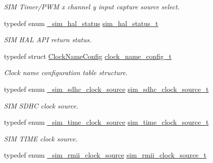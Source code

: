 \begin{DoxyCompactItemize}
\begin{DoxyCompactList}\small\item\em S\+IM Timer/\+P\+WM x channel y input capture source select. \end{DoxyCompactList}\item 
typedef enum \hyperlink{group__sim__hal_ga3a1d5c9d6e79932e64f798c04fae38fd}{\+\_\+sim\+\_\+hal\+\_\+status} \hyperlink{group__sim__hal_ga7e691721ba86531e94387971c652aa08}{sim\+\_\+hal\+\_\+status\+\_\+t}\hypertarget{group__sim__hal_ga7e691721ba86531e94387971c652aa08}{}\label{group__sim__hal_ga7e691721ba86531e94387971c652aa08}

\begin{DoxyCompactList}\small\item\em S\+IM H\+AL A\+PI return status. \end{DoxyCompactList}\item 
typedef struct \hyperlink{structClockNameConfig}{Clock\+Name\+Config} \hyperlink{group__sim__hal_ga0d84063eacefa134ba3be72a9c70222c}{clock\+\_\+name\+\_\+config\+\_\+t}\hypertarget{group__sim__hal_ga0d84063eacefa134ba3be72a9c70222c}{}\label{group__sim__hal_ga0d84063eacefa134ba3be72a9c70222c}

\begin{DoxyCompactList}\small\item\em Clock name configuration table structure. \end{DoxyCompactList}\item 
typedef enum \hyperlink{group__sim__hal_gad298a91a63548d70748d40d8a485f3e1}{\+\_\+sim\+\_\+sdhc\+\_\+clock\+\_\+source} \hyperlink{group__sim__hal_ga8e71ec33f7769f4392126e7acc92b6d2}{sim\+\_\+sdhc\+\_\+clock\+\_\+source\+\_\+t}\hypertarget{group__sim__hal_ga8e71ec33f7769f4392126e7acc92b6d2}{}\label{group__sim__hal_ga8e71ec33f7769f4392126e7acc92b6d2}

\begin{DoxyCompactList}\small\item\em S\+IM S\+D\+HC clock source. \end{DoxyCompactList}\item 
typedef enum \hyperlink{group__sim__hal_ga9ba1c9896979d291bef95527f789bce5}{\+\_\+sim\+\_\+time\+\_\+clock\+\_\+source} \hyperlink{group__sim__hal_ga679c7384fcf18e6dca91748a9609728c}{sim\+\_\+time\+\_\+clock\+\_\+source\+\_\+t}\hypertarget{group__sim__hal_ga679c7384fcf18e6dca91748a9609728c}{}\label{group__sim__hal_ga679c7384fcf18e6dca91748a9609728c}

\begin{DoxyCompactList}\small\item\em S\+IM T\+I\+ME clock source. \end{DoxyCompactList}\item 
typedef enum \hyperlink{group__sim__hal_ga37be85d1a46e05464021dc63dabbcce9}{\+\_\+sim\+\_\+rmii\+\_\+clock\+\_\+source} \hyperlink{group__sim__hal_ga26ca607d386af281cf580e52705423fb}{sim\+\_\+rmii\+\_\+clock\+\_\+source\+\_\+t}\hypertarget{group__sim__hal_ga26ca607d386af281cf580e52705423fb}{}\label{group__sim__hal_ga26ca607d386af281cf580e52705423fb}


\end{DoxyCompactItemize}
